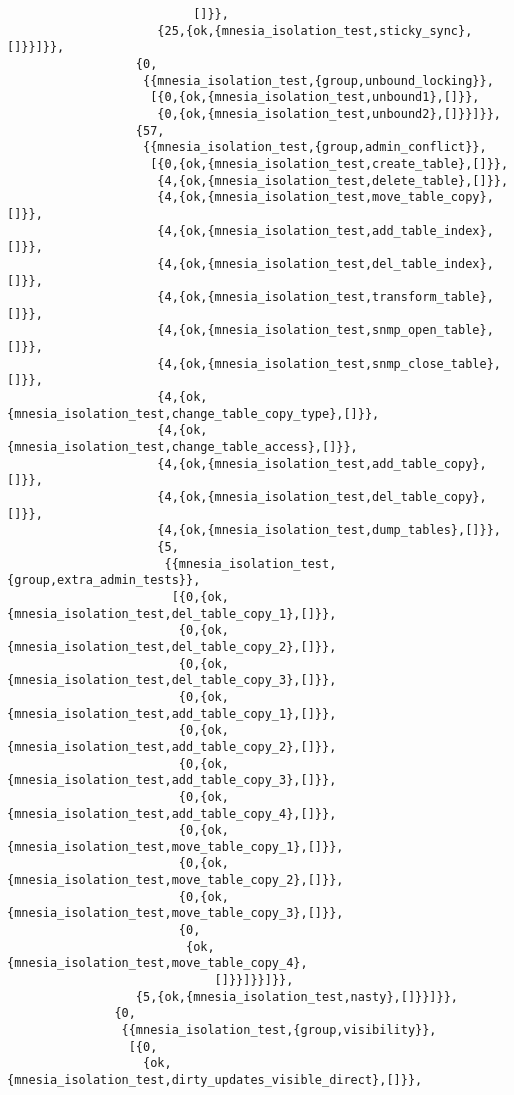 \begin{verbatim}
                          []}},
                     {25,{ok,{mnesia_isolation_test,sticky_sync},[]}}]}},
                  {0,
                   {{mnesia_isolation_test,{group,unbound_locking}},
                    [{0,{ok,{mnesia_isolation_test,unbound1},[]}},
                     {0,{ok,{mnesia_isolation_test,unbound2},[]}}]}},
                  {57,
                   {{mnesia_isolation_test,{group,admin_conflict}},
                    [{0,{ok,{mnesia_isolation_test,create_table},[]}},
                     {4,{ok,{mnesia_isolation_test,delete_table},[]}},
                     {4,{ok,{mnesia_isolation_test,move_table_copy},[]}},
                     {4,{ok,{mnesia_isolation_test,add_table_index},[]}},
                     {4,{ok,{mnesia_isolation_test,del_table_index},[]}},
                     {4,{ok,{mnesia_isolation_test,transform_table},[]}},
                     {4,{ok,{mnesia_isolation_test,snmp_open_table},[]}},
                     {4,{ok,{mnesia_isolation_test,snmp_close_table},[]}},
                     {4,{ok,{mnesia_isolation_test,change_table_copy_type},[]}},
                     {4,{ok,{mnesia_isolation_test,change_table_access},[]}},
                     {4,{ok,{mnesia_isolation_test,add_table_copy},[]}},
                     {4,{ok,{mnesia_isolation_test,del_table_copy},[]}},
                     {4,{ok,{mnesia_isolation_test,dump_tables},[]}},
                     {5,
                      {{mnesia_isolation_test,{group,extra_admin_tests}},
                       [{0,{ok,{mnesia_isolation_test,del_table_copy_1},[]}},
                        {0,{ok,{mnesia_isolation_test,del_table_copy_2},[]}},
                        {0,{ok,{mnesia_isolation_test,del_table_copy_3},[]}},
                        {0,{ok,{mnesia_isolation_test,add_table_copy_1},[]}},
                        {0,{ok,{mnesia_isolation_test,add_table_copy_2},[]}},
                        {0,{ok,{mnesia_isolation_test,add_table_copy_3},[]}},
                        {0,{ok,{mnesia_isolation_test,add_table_copy_4},[]}},
                        {0,{ok,{mnesia_isolation_test,move_table_copy_1},[]}},
                        {0,{ok,{mnesia_isolation_test,move_table_copy_2},[]}},
                        {0,{ok,{mnesia_isolation_test,move_table_copy_3},[]}},
                        {0,
                         {ok,{mnesia_isolation_test,move_table_copy_4},
                             []}}]}}]}},
                  {5,{ok,{mnesia_isolation_test,nasty},[]}}]}},
               {0,
                {{mnesia_isolation_test,{group,visibility}},
                 [{0,
                   {ok,{mnesia_isolation_test,dirty_updates_visible_direct},[]}},

\end{verbatim}
